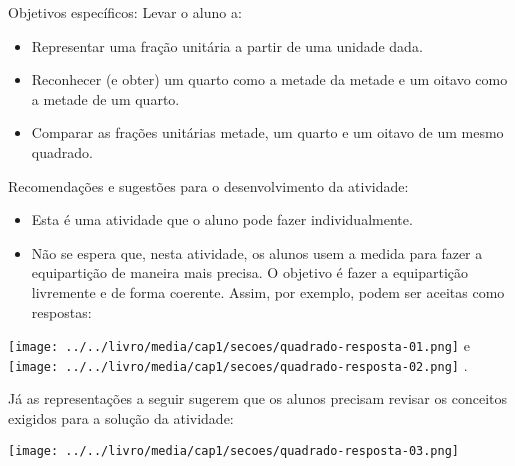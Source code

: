\documentclass[a4paper,12pt,twoside]{book}
\begin{document}
\begin{professor*}[breakable]{}{}  
  
  Objetivos específicos: Levar o aluno a:  
\begin{itemize} %
    \item       Representar uma fração unitária a partir de uma unidade dada.  
    \item       Reconhecer (e obter) um quarto como a metade da metade e um oitavo como a metade de um quarto.
    \item       Comparar as frações unitárias metade, um quarto e um oitavo de um mesmo quadrado.
\end{itemize} %
  
  
  Recomendações e sugestões para o desenvolvimento da atividade:  
\begin{itemize} %
    \item       Esta é uma atividade que o aluno pode fazer individualmente. 
    \item       Não se espera que, nesta atividade, os alunos usem a medida para fazer a equipartição de maneira mais precisa. O objetivo é fazer a equipartição livremente e de forma coerente. Assim, por exemplo, podem ser aceitas como respostas:
\end{itemize} %
  
  
    \texttt{[image: ../../livro/media/cap1/secoes/quadrado-resposta-01.png]}   e     \texttt{[image: ../../livro/media/cap1/secoes/quadrado-resposta-02.png]}  .  
  
  Já as representações a seguir sugerem que os alunos precisam revisar os conceitos exigidos para a solução da atividade:  
  
    \texttt{[image: ../../livro/media/cap1/secoes/quadrado-resposta-03.png]}  
  

\end{professor*}
\end{document}
